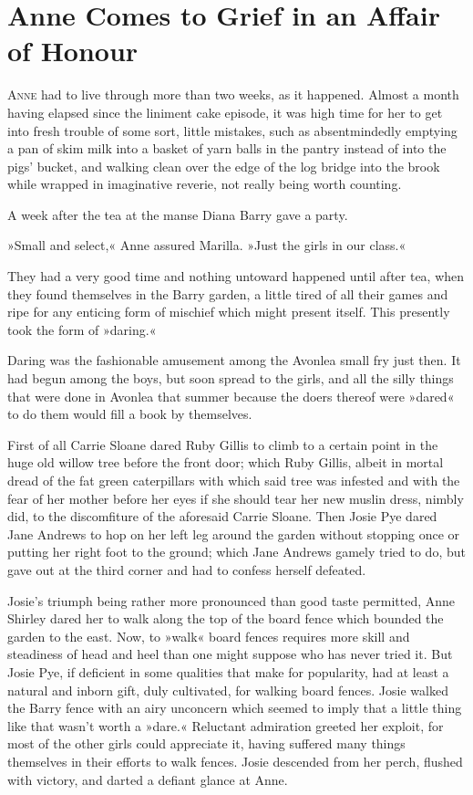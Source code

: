 \chapter{Anne Comes to Grief in an Affair of Honour}

\lettrine[lines=4]{A}{nne} had to live through more than two weeks, as it happened. Almost a month having elapsed since the liniment cake episode, it was high time for her to get into fresh trouble of some sort, little mistakes, such as absentmindedly emptying a pan of skim milk into a basket of yarn balls in the pantry instead of into the pigs’ bucket, and walking clean over the edge of the log bridge into the brook while wrapped in imaginative reverie, not really being worth counting.

A week after the tea at the manse Diana Barry gave a party.

»Small and select,« Anne assured Marilla. »Just the girls in our class.«

They had a very good time and nothing untoward happened until after tea, when they found themselves in the Barry garden, a little tired of all their games and ripe for any enticing form of mischief which might present itself. This presently took the form of »daring.«

Daring was the fashionable amusement among the Avonlea small fry just then. It had begun among the boys, but soon spread to the girls, and all the silly things that were done in Avonlea that summer because the doers thereof were »dared« to do them would fill a book by themselves.

First of all Carrie Sloane dared Ruby Gillis to climb to a certain point in the huge old willow tree before the front door; which Ruby Gillis, albeit in mortal dread of the fat green caterpillars with which said tree was infested and with the fear of her mother before her eyes if she should tear her new muslin dress, nimbly did, to the discomfiture of the aforesaid Carrie Sloane. Then Josie Pye dared Jane Andrews to hop on her left leg around the garden without stopping once or putting her right foot to the ground; which Jane Andrews gamely tried to do, but gave out at the third corner and had to confess herself defeated.

Josie’s triumph being rather more pronounced than good taste permitted, Anne Shirley dared her to walk along the top of the board fence which bounded the garden to the east. Now, to »walk« board fences requires more skill and steadiness of head and heel than one might suppose who has never tried it. But Josie Pye, if deficient in some qualities that make for popularity, had at least a natural and inborn gift, duly cultivated, for walking board fences. Josie walked the Barry fence with an airy unconcern which seemed to imply that a little thing like that wasn’t worth a »dare.« Reluctant admiration greeted her exploit, for most of the other girls could appreciate it, having suffered many things themselves in their efforts to walk fences. Josie descended from her perch, flushed with victory, and darted a defiant glance at Anne.


